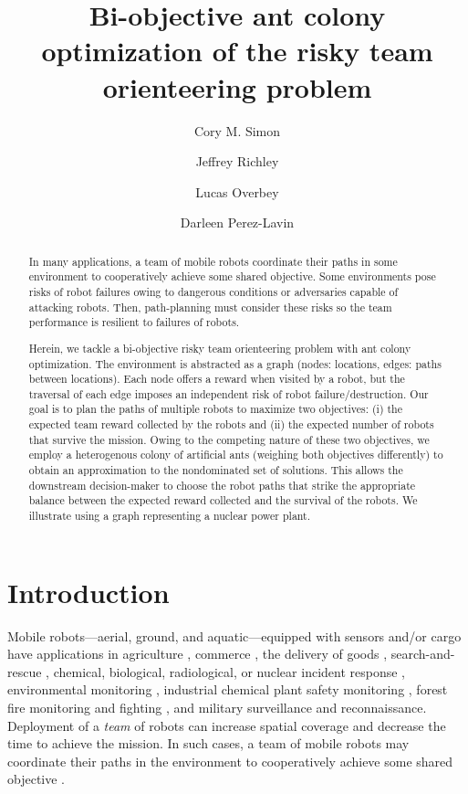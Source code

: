 \documentclass[11pt, oneside]{article}
\title{Bi-objective ant colony optimization of the risky team orienteering problem}
\author[1]{Cory M. Simon}
\author[2]{Jeffrey Richley}
\author[2]{Lucas Overbey}
\author[2]{Darleen Perez-Lavin}
\affil[1]{School of Chemical, Biological, and Environmental Engineering. Oregon State University. Corvallis, OR. USA.}
\affil[2]{Naval Information Warfare Center Atlantic. Charleston, SC. USA.}
\begin{document}
\maketitle

\begin{abstract}
In many applications, a team of mobile robots coordinate their paths in some environment to cooperatively achieve some shared objective. Some environments pose risks of robot failures owing to dangerous conditions or adversaries capable of attacking robots. Then, path-planning must consider these risks so the team performance is resilient to failures of robots.

Herein, we tackle a bi-objective risky team orienteering problem with ant colony optimization. The environment is abstracted as a graph (nodes: locations, edges: paths between locations). Each node offers a reward when visited by a robot, but the traversal of each edge imposes an independent risk of robot failure/destruction. Our goal is to plan the paths of multiple robots to maximize two objectives: (i) the expected team reward collected by the robots and (ii) the expected number of robots that survive the mission. Owing to the competing nature of these two objectives, we employ a heterogenous colony of artificial ants (weighing both objectives differently) to obtain an approximation to the nondominated set of solutions. This allows the downstream decision-maker to choose the robot paths that strike the appropriate balance between the expected reward collected and the survival of the robots. We illustrate using a graph representing a nuclear power plant.
\end{abstract}

\clearpage

\section{Introduction}
Mobile robots---aerial, ground, and aquatic---equipped with sensors and/or cargo have applications in agriculture \cite{santos2020path}, commerce \cite{bogue2016growth}, the delivery of goods \cite{coelho2014thirty}, search-and-rescue \cite{queralta2020collaborative}, chemical, biological, radiological, or nuclear incident response \cite{murphy2012projected}, environmental monitoring \cite{dunbabin2012robots}, industrial chemical plant safety monitoring \cite{soldan2014towards}, forest fire monitoring and fighting \cite{merino2012unmanned}, and military surveillance and reconnaissance. 
Deployment of a \emph{team} of robots can increase spatial coverage and decrease the time to achieve the mission. 
In such cases, a team of mobile robots may coordinate their paths in the environment to cooperatively achieve some shared objective \cite{parker2007distributed}.
\end{document}
